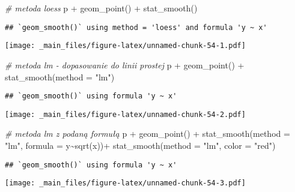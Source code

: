 \documentclass[
]{book}
\newenvironment{Shaded}{\begin{snugshade}}{\end{snugshade}}
\newcommand{\AttributeTok}[1]{\textcolor[rgb]{0.77,0.63,0.00}{#1}}
\newcommand{\CommentTok}[1]{\textcolor[rgb]{0.56,0.35,0.01}{\textit{#1}}}
\newcommand{\FunctionTok}[1]{\textcolor[rgb]{0.00,0.00,0.00}{#1}}
\newcommand{\NormalTok}[1]{#1}
\newcommand{\SpecialCharTok}[1]{\textcolor[rgb]{0.00,0.00,0.00}{#1}}
\newcommand{\StringTok}[1]{\textcolor[rgb]{0.31,0.60,0.02}{#1}}
\begin{document}
\begin{Shaded}
\begin{Highlighting}[]
\CommentTok{\# metoda loess}
\NormalTok{p }\SpecialCharTok{+} \FunctionTok{geom\_point}\NormalTok{() }\SpecialCharTok{+} \FunctionTok{stat\_smooth}\NormalTok{()}
\end{Highlighting}
\end{Shaded}

\begin{verbatim}
## `geom_smooth()` using method = 'loess' and formula 'y ~ x'
\end{verbatim}

\texttt{[image: \_main\_files/figure-latex/unnamed-chunk-54-1.pdf]}

\begin{Shaded}
\begin{Highlighting}[]
\CommentTok{\# metoda lm {-} dopasowanie do linii prostej}
\NormalTok{p }\SpecialCharTok{+} \FunctionTok{geom\_point}\NormalTok{() }\SpecialCharTok{+} \FunctionTok{stat\_smooth}\NormalTok{(}\AttributeTok{method =} \StringTok{"lm"}\NormalTok{)}
\end{Highlighting}
\end{Shaded}

\begin{verbatim}
## `geom_smooth()` using formula 'y ~ x'
\end{verbatim}

\texttt{[image: \_main\_files/figure-latex/unnamed-chunk-54-2.pdf]}

\begin{Shaded}
\begin{Highlighting}[]
\CommentTok{\# metoda lm z podaną formułą}
\NormalTok{p }\SpecialCharTok{+} \FunctionTok{geom\_point}\NormalTok{() }\SpecialCharTok{+} \FunctionTok{stat\_smooth}\NormalTok{(}\AttributeTok{method =} \StringTok{"lm"}\NormalTok{, }\AttributeTok{formula =}\NormalTok{ y}\SpecialCharTok{\textasciitilde{}}\FunctionTok{sqrt}\NormalTok{(x))}\SpecialCharTok{+}
  \FunctionTok{stat\_smooth}\NormalTok{(}\AttributeTok{method =} \StringTok{"lm"}\NormalTok{, }\AttributeTok{color =} \StringTok{"red"}\NormalTok{)}
\end{Highlighting}
\end{Shaded}

\begin{verbatim}
## `geom_smooth()` using formula 'y ~ x'
\end{verbatim}

\texttt{[image: \_main\_files/figure-latex/unnamed-chunk-54-3.pdf]}
\end{document}
